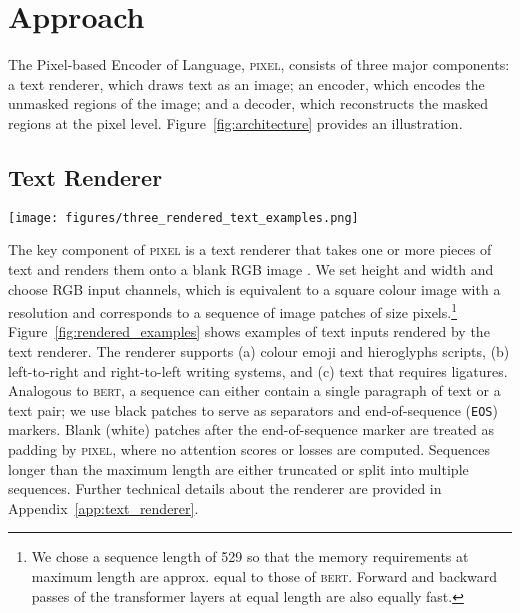 \documentclass{article}
\newcommand{\model}{\textsc{pixel}\xspace}
\begin{document}
\vspace{-2mm}
\section{Approach}
\vspace{-3mm}

The Pixel-based Encoder of Language, \model, consists of three major components: a text renderer, which draws text as an image; an encoder, which encodes the unmasked regions of the image; and a decoder, which reconstructs the masked regions at the pixel level. Figure~\ref{fig:architecture} provides an illustration.

\vspace{-3mm}
\subsection{Text Renderer}
\vspace{-2mm}

\label{sec:renderer}

\begin{figure*}[t]
    \texttt{[image: figures/three\_rendered\_text\_examples.png]}
    \caption{Illustrative examples of our rendered text. \model natively supports most writing systems, colour emoji (a), and complex text layouts such as right-to-left writing and ligatures (b). Black patches serve as separators and end-of-sequence markers. Blank patches to the right of the end-of-sequence marker are treated as sequence padding. For word-level tasks, horizontal spacing can be added between words (c) so that every patch can be assigned to exactly one word (dotted lines indicate patch boundaries for demonstration).} 
    \label{fig:rendered_examples}
    \vspace{-2mm}
\end{figure*}

The key component of \model is a text renderer that takes one or more pieces of text and renders them onto a blank RGB image . We set height  and width  and choose  RGB input channels, which is equivalent to a square colour image with a  resolution and corresponds to a sequence of  image patches of size  pixels.\footnote{We chose a sequence length of 529 so that the memory requirements at maximum length are approx. equal to those of \textsc{bert}. Forward and backward passes of the transformer layers at equal length are also equally fast.}
Figure~\ref{fig:rendered_examples} shows examples of text inputs
rendered by the text renderer. 
The renderer supports (a) colour emoji and hieroglyphs scripts, (b) left-to-right and right-to-left writing systems, and (c) text that requires ligatures.  Analogous to \textsc{bert}, a sequence can either contain a single paragraph of text or a text pair; we use black  patches to serve as separators and end-of-sequence ({\footnotesize\texttt{EOS}}) markers. Blank (white) patches after the end-of-sequence marker are treated as padding by \model, where no attention scores or losses are computed. Sequences longer than the maximum length are either truncated or split into multiple sequences. Further technical details about the renderer are provided in Appendix~\ref{app:text_renderer}.
\end{document}

